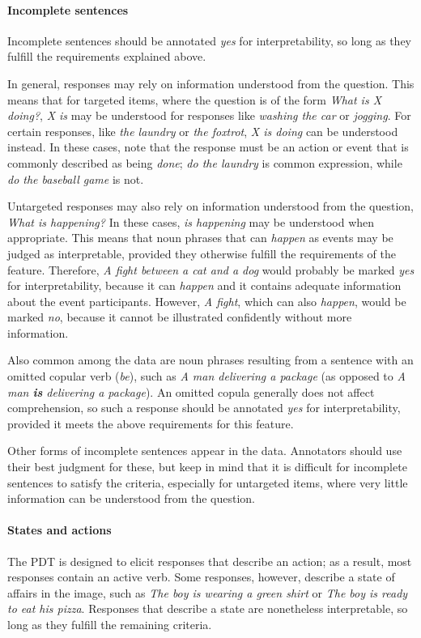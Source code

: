\documentclass[12pt]{article}
\begin{document}
\paragraph{Incomplete sentences} \label{para:interp-incomplete} Incomplete sentences should be annotated \textit{yes} for interpretability, so long as they fulfill the requirements explained above.

In general, responses may rely on information understood from the question. This means that for targeted items, where the question is of the form \textit{What is X doing?}, \textit{X is} may be understood for responses like \textit{washing the car} or \textit{jogging}. For certain responses, like \textit{the laundry} or \textit{the foxtrot}, \textit{X is doing} can be understood instead. In these cases, note that the response must be an action or event that is commonly described as being \textit{done}; \textit{do the laundry} is common expression, while \textit{do the baseball game} is not. 

Untargeted responses may also rely on information understood from the question, \textit{What is happening?} In these cases, \textit{is happening} may be understood when appropriate. This means that noun phrases that can \textit{happen} as events may be judged as interpretable, provided they otherwise fulfill the requirements of the feature. Therefore, \textit{A fight between a cat and a dog} would probably be marked \textit{yes} for interpretability, because it can \textit{happen} and it contains adequate information about the event participants. However, \textit{A fight}, which can also \textit{happen}, would be marked \textit{no}, because it cannot be illustrated confidently without more information.

Also common among the data are noun phrases resulting from a sentence with an omitted copular verb (\textit{be}), such as \textit{A man delivering a package} (as opposed to \textit{A man \textbf{is} delivering a package}). An omitted copula generally does not affect comprehension, so such a response should be annotated \textit{yes} for interpretability, provided it meets the above requirements for this feature.

Other forms of incomplete sentences appear in the data. Annotators should use their best judgment for these, but keep in mind that it is difficult for incomplete sentences to satisfy the criteria, especially for untargeted items, where very little information can be understood from the question.

\paragraph{States and actions} \label{para:interp-question} The PDT is designed to elicit responses that describe an action; as a result, most responses contain an active verb. Some responses, however, describe a state of affairs in the image, such as \textit{The boy is wearing a green shirt} or \textit{The boy is ready to eat his pizza}. Responses that describe a state are nonetheless interpretable, so long as they fulfill the remaining criteria.
\end{document}

